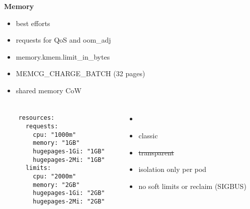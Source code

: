 \documentclass[usenames,dvipsnames, 18pt, compress, aspectratio=169]{beamer}
\begin{document}
\begin{frame}
    \frametitle{}
    \begin{center}
    \textbf{Memory}

        \begin{itemize}[label={\MVRightarrow}]
            \item best efforts
            \item requests for QoS and oom\_adj
            \item memory.kmem.limit\_in\_bytes
            \item MEMCG\_CHARGE\_BATCH (32 pages)
            \item shared memory CoW
        \end{itemize}

    \end{center}
\end{frame}

\begin{frame}[fragile]{}
    \frametitle{}
    \begin{columns}
        \begin{column}{0.48\columnwidth}
        \begin{verbatim}
    resources:
      requests:
        cpu: "1000m"
        memory: "1GB"
        hugepages-1Gi: "1GB"
        hugepages-2Mi: "1GB"
      limits:
        cpu: "2000m"
        memory: "2GB"
        hugepages-1Gi: "2GB"
        hugepages-2Mi: "2GB"
        \end{verbatim}
        \end{column}

        \begin{column}{0.48\columnwidth}
            \vspace*{-2.5em}
            \begin{center}
                \begin{itemize}
                    \item <+->
                \end{itemize}

                \begin{itemize}[label={\MVRightarrow}]
                    \item classic
                    \item \sout{transparent}
                    \item isolation only per pod
                    \item no soft limits or reclaim (SIGBUS)
                \end{itemize}
            \end{center}
        \end{column}

    \end{columns}
\end{frame}
\end{document}
